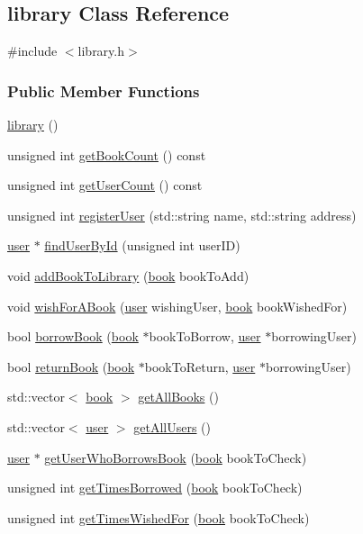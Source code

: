 \hypertarget{classlibrary}{\subsection{library Class Reference}
\label{classlibrary}
}


{\ttfamily \#include $<$library.\+h$>$}

\subsubsection*{Public Member Functions}
\begin{DoxyCompactItemize}
\item 
\hyperlink{classlibrary_a2137d3edeea39929e8f111432c85bc79}{library} ()
\item 
unsigned int \hyperlink{classlibrary_a9f0cd0c7f6f68d4c90844131be1b690b}{get\+Book\+Count} () const 
\item 
unsigned int \hyperlink{classlibrary_ae779d38fc69cb29c23f103c1a0f1f556}{get\+User\+Count} () const 
\item 
unsigned int \hyperlink{classlibrary_aa6ec346e2b49ee2a78b1c8f5ebbf7f79}{register\+User} (std\+::string name, std\+::string address)
\item 
\hyperlink{classuser}{user} $\ast$ \hyperlink{classlibrary_a6c04fa5207a2dc59e00882cb9aa66eb1}{find\+User\+By\+Id} (unsigned int user\+I\+D)
\item 
void \hyperlink{classlibrary_abe4fe5bfd3355630fedbefd7828ee03e}{add\+Book\+To\+Library} (\hyperlink{classbook}{book} book\+To\+Add)
\item 
void \hyperlink{classlibrary_a820b95e5a2738e923c6609ea68517286}{wish\+For\+A\+Book} (\hyperlink{classuser}{user} wishing\+User, \hyperlink{classbook}{book} book\+Wished\+For)
\item 
bool \hyperlink{classlibrary_a72e06b28f9282c81bfb0760b0c07ffba}{borrow\+Book} (\hyperlink{classbook}{book} $\ast$book\+To\+Borrow, \hyperlink{classuser}{user} $\ast$borrowing\+User)
\item 
bool \hyperlink{classlibrary_ac96feb544ebc882b53457ccbcf8f9196}{return\+Book} (\hyperlink{classbook}{book} $\ast$book\+To\+Return, \hyperlink{classuser}{user} $\ast$borrowing\+User)
\item 
std\+::vector$<$ \hyperlink{classbook}{book} $>$ \hyperlink{classlibrary_a923bf0a858616abc8fb3f536a4d69cf6}{get\+All\+Books} ()
\item 
std\+::vector$<$ \hyperlink{classuser}{user} $>$ \hyperlink{classlibrary_aa128a867b3ac05e2801d7c3dd5691038}{get\+All\+Users} ()
\item 
\hyperlink{classuser}{user} $\ast$ \hyperlink{classlibrary_a6c3bdf1f2614b6b7459ebcc898f8636f}{get\+User\+Who\+Borrows\+Book} (\hyperlink{classbook}{book} book\+To\+Check)
\item 
unsigned int \hyperlink{classlibrary_a297c4813872bbba3f8088a4acc3f7b6d}{get\+Times\+Borrowed} (\hyperlink{classbook}{book} book\+To\+Check)
\item 
unsigned int \hyperlink{classlibrary_ae6b0c037908e328dcf3a9dfb946ed5f2}{get\+Times\+Wished\+For} (\hyperlink{classbook}{book} book\+To\+Check)
\end{DoxyCompactItemize}


